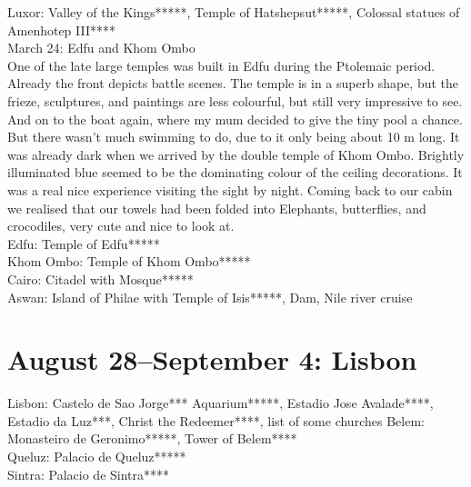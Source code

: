 Luxor: Valley of the Kings*****, Temple of Hatshepsut*****, Colossal statues of Amenhotep III****\\

March 24: Edfu and Khom Ombo\\
One of the late large temples was built in Edfu during the Ptolemaic period. Already the front depicts battle scenes. The temple is in a superb shape, but the frieze, sculptures, and paintings are less colourful, but still very impressive to see. And on to the boat again, where my mum decided to give the tiny pool a chance. But there wasn't much swimming to do, due to it only being about 10 m long. It was already dark when we arrived by
 the double temple of Khom Ombo. Brightly illuminated blue seemed to be the dominating colour of the ceiling decorations. It was a real nice experience visiting the sight by night. Coming back to our cabin we realised that our towels had been folded into Elephants, butterflies, and crocodiles, very cute and nice to look at.\\
 
Edfu: Temple of Edfu*****\\
Khom Ombo: Temple of Khom Ombo*****\\
 


Cairo: Citadel with Mosque***** \\
Aswan: Island of Philae with Temple of Isis*****, Dam, Nile river cruise

\section{August 28--September 4: Lisbon}
\label{2005:lisbon}


Lisbon: Castelo de Sao Jorge*** Aquarium*****, Estadio Jose Avalade****, Estadio da Luz***, Christ the Redeemer****, list of some churches
Belem: Monasteiro de Geronimo*****, Tower of Belem****\\
Queluz: Palacio de Queluz*****\\
Sintra: Palacio de Sintra****